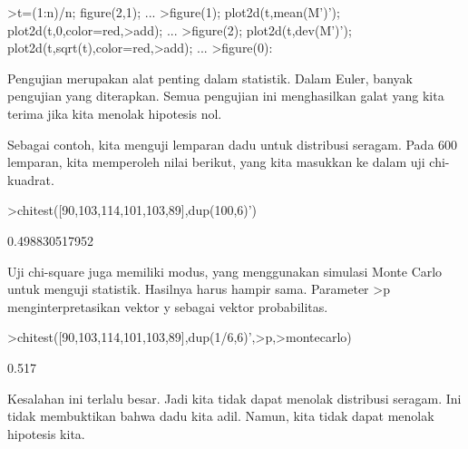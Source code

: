 \documentclass[a4paper,10pt]{article}
\begin{document}
\begin{eulernotebook}
\begin{eulercomment}
\begin{eulercomment}
\begin{eulercomment}
\begin{eulercomment}
\begin{eulercomment}
\begin{eulercomment}
\begin{eulercomment}
\begin{eulercomment}
\begin{eulercomment}
\begin{eulercomment}
\begin{eulercomment}
\begin{eulercomment}
\begin{eulercomment}
\begin{eulercomment}
\begin{eulercomment}
\begin{eulercomment}
\begin{eulercomment}
\begin{eulercomment}
\begin{eulercomment}
\begin{eulercomment}
\begin{eulercomment}
\begin{eulercomment}
\begin{eulercomment}
\begin{eulercomment}
\begin{eulercomment}
\begin{eulercomment}
\begin{eulercomment}
\begin{eulercomment}
\begin{eulercomment}
\begin{eulercomment}
\begin{eulercomment}
\begin{eulercomment}
\begin{eulerprompt}
>t=(1:n)/n; figure(2,1); ...
>figure(1); plot2d(t,mean(M')'); plot2d(t,0,color=red,>add); ...
>figure(2); plot2d(t,dev(M')'); plot2d(t,sqrt(t),color=red,>add); ...
>figure(0):
\end{eulerprompt}
\begin{eulercomment}
Pengujian merupakan alat penting dalam statistik. Dalam Euler, banyak
pengujian yang diterapkan. Semua pengujian ini menghasilkan galat yang
kita terima jika kita menolak hipotesis nol.

Sebagai contoh, kita menguji lemparan dadu untuk distribusi seragam.
Pada 600 lemparan, kita memperoleh nilai berikut, yang kita masukkan
ke dalam uji chi-kuadrat.
\end{eulercomment}
\begin{eulerprompt}
>chitest([90,103,114,101,103,89],dup(100,6)')
\end{eulerprompt}
\begin{euleroutput}
  0.498830517952
\end{euleroutput}
\begin{eulercomment}
Uji chi-square juga memiliki modus, yang menggunakan simulasi Monte
Carlo untuk menguji statistik. Hasilnya harus hampir sama. Parameter
\textgreater{}p menginterpretasikan vektor y sebagai vektor probabilitas.
\end{eulercomment}
\begin{eulerprompt}
>chitest([90,103,114,101,103,89],dup(1/6,6)',>p,>montecarlo)
\end{eulerprompt}
\begin{euleroutput}
  0.517
\end{euleroutput}
\begin{eulercomment}
Kesalahan ini terlalu besar. Jadi kita tidak dapat menolak distribusi
seragam. Ini tidak membuktikan bahwa dadu kita adil. Namun, kita tidak
dapat menolak hipotesis kita.


\end{eulercomment}
\end{eulercomment}
\end{eulercomment}
\end{eulercomment}
\end{eulercomment}
\end{eulercomment}
\end{eulercomment}
\end{eulercomment}
\end{eulercomment}
\end{eulercomment}
\end{eulercomment}
\end{eulercomment}
\end{eulercomment}
\end{eulercomment}
\end{eulercomment}
\end{eulercomment}
\end{eulercomment}
\end{eulercomment}
\end{eulercomment}
\end{eulercomment}
\end{eulercomment}
\end{eulercomment}
\end{eulercomment}
\end{eulercomment}
\end{eulercomment}
\end{eulercomment}
\end{eulercomment}
\end{eulercomment}
\end{eulercomment}
\end{eulercomment}
\end{eulercomment}
\end{eulercomment}
\end{eulercomment}
\end{eulernotebook}
\end{document}
